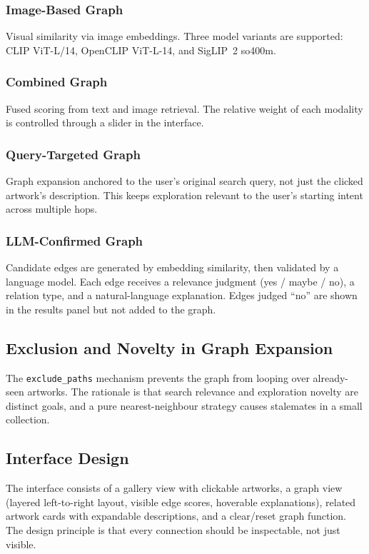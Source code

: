 \documentclass[12pt, a4paper]{article}
\begin{document}
\subsubsection{Image-Based Graph}
Visual similarity via image embeddings. Three model variants are supported: CLIP ViT-L/14,
OpenCLIP ViT-L-14, and SigLIP~2 so400m.

\subsubsection{Combined Graph}
Fused scoring from text and image retrieval. The relative weight of each modality is controlled
through a slider in the interface.

\subsubsection{Query-Targeted Graph}
Graph expansion anchored to the user's original search query, not just the clicked artwork's
description. This keeps exploration relevant to the user's starting intent across multiple hops.

\subsubsection{LLM-Confirmed Graph}
Candidate edges are generated by embedding similarity, then validated by a language model.
Each edge receives a relevance judgment (yes / maybe / no), a relation type, and a natural-language
explanation. Edges judged ``no'' are shown in the results panel but not added to the graph.

\subsection{Exclusion and Novelty in Graph Expansion}

The \texttt{exclude\_paths} mechanism prevents the graph from looping over already-seen
artworks. The rationale is that search relevance and exploration novelty are distinct goals, and
a pure nearest-neighbour strategy causes stalemates in a small collection.

\subsection{Interface Design}

The interface consists of a gallery view with clickable artworks, a graph view (layered
left-to-right layout, visible edge scores, hoverable explanations), related artwork cards with
expandable descriptions, and a clear/reset graph function. The design principle is that every
connection should be inspectable, not just visible.
\end{document}
